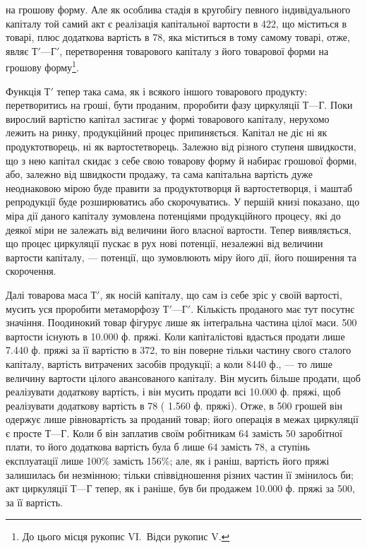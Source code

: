 \parcont{}  %
на грошову форму. Але як особлива стадія в кругобігу певного індивідуального
капіталу той самий акт є реалізація капітальної вартости
в 422, що міститься в товарі, плюс додаткова вартість в 78, яка міститься в тому самому товарі, отже, являє $Т' — Г'$, перетворення
товарового капіталу з його товарової форми на грошову форму\footnote{
До цього місця рукопис VI.~Відси рукопис V.
}.

\label{original-16}
Функція $Т'$ тепер така сама, як і всякого іншого товарового продукту:
перетворитись на гроші, бути проданим, проробити фазу циркуляції
$Т — Г$. Поки вирослий вартістю капітал застигає у формі товарового
капіталу, нерухомо лежить на ринку, продукційний процес припиняється.
Капітал не діє ні як продуктотворець, ні як вартостетворець. Залежно від
різного ступеня швидкости, що з нею капітал скидає з себе свою товарову
форму й набирає грошової форми, або, залежно від швидкости продажу,
та сама капітальна вартість дуже неоднаковою мірою буде правити за
продуктотворця й вартостетворця, і маштаб репродукції буде розширюватись
або скорочуватись. У першій книзі показано, що міра дії даного
капіталу зумовлена потенціями продукційного процесу, які до деякої
міри не залежать від величини його власної вартости. Тепер виявляється,
що процес циркуляції пускає в рух нові потенції, незалежні від величини
вартости капіталу, — потенції, що зумовлюють міру його дії, його поширення
та скорочення.

Далі товарова маса $Т'$, як носій капіталу, що сам із себе зріс у своїй
вартості, мусить уся проробити метаморфозу $Т' — Г'$. Кількість проданого
має тут посутнє значіння. Поодинокий товар фігурує лише як інтеґральна
частина цілої маси. 500 вартости існують в \num{10.000} ф. пряжі.
Коли капіталістові вдасться продати лише \num{7.440} ф. пряжі за її вартістю
в 372, то він поверне тільки частину свого сталого капіталу,
вартість витрачених засобів продукції; а коли 8440 ф., — то лише величину
вартости цілого авансованого капіталу. Він мусить більше продати, щоб
реалізувати додаткову вартість, і він мусить продати всі \num{10.000} ф.
пряжі, щоб реалізувати додаткову вартість в 78 (\deq{} \num{1.560} ф.
пряжі). Отже, в 500 грошей він одержує лише рівновартість
за проданий товар; його операція в межах циркуляції є просте $Т — Г$.
Коли б він заплатив своїм робітникам 64 замість 50
заробітної плати, то його додаткова вартість була б лише 64
замість 78, а ступінь експлуатації лише 100\% замість
156\%; але, як і раніш, вартість його пряжі залишилась би незмінною;
тільки співвідношення різних частин її змінилось би; акт циркуляції $Т — Г$
тепер, як і раніше, був би продажем \num{10.000} ф. пряжі за 500,
за її вартість.

